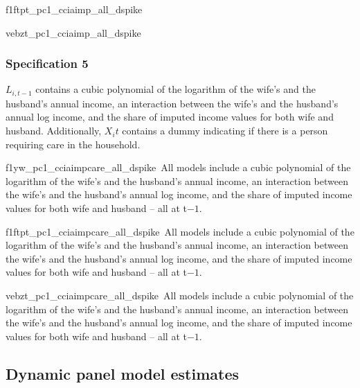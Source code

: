 \documentclass[a4paper,11pt]{scrartcl}
\begin{document}
\begin{appendix}
		{f1ftpt_pc1_cciaimp_all_dspike}%
		{\samplenote\,\specnote}

		{vebzt_pc1_cciaimp_all_dspike}%
		{\samplenote\,\specnote}


		\subsubsection{Specification 5}

		$L_{i,t-1}$ contains a cubic polynomial of the logarithm of the wife's and the husband's annual income, an interaction between the wife's and the husband's annual log income, and the share of imputed income values for both wife and husband. Additionally, $X_it$ contains a dummy indicating if there is a person requiring care in the household.

		\renewcommand{\specnote}{All models include a cubic polynomial of the logarithm of the wife's and the husband's annual income, an interaction between the wife's and the husband's annual log income, and the share of imputed income values for both wife and husband -- all at t$-1$.}

		\renewcommand{\xtfenoteB}{All models include dummies for age groups of 5 years for both spouses, dummy variables for the age of the youngest child in the household, a dummy indicating a person requiring care in the household, the district level unemployment rate at the month of the interview, and dummy variables for the survey year -- all at t. Averaged over 25 simulation runs based on procedures described in the data section. Standard errors clustered on couple level in parentheses; *** p$<$0.001, ** p$<$0.01, * p$<$0.05, \dag\, p$<$0.1}

		{f1yw_pc1_cciaimpcare_all_dspike}%
		{\samplenote\,\specnote}

		{f1ftpt_pc1_cciaimpcare_all_dspike}%
		{\samplenote\,\specnote}

		{vebzt_pc1_cciaimpcare_all_dspike}%
		{\samplenote\,\specnote}


	\clearpage
	\subsection{Dynamic panel model estimates}
	\setcounter{table}{0}
	\setcounter{figure}{0}


\end{appendix}
\end{document}
